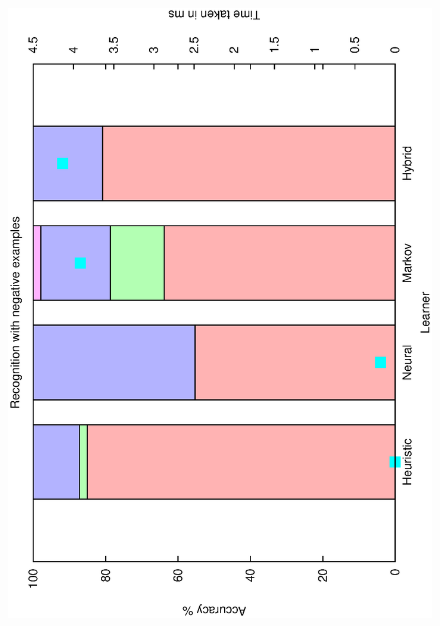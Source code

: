 \documentclass[12pt,a4,notitlepage]{report}
\renewcommand{\_}{\texttt{\symbol{95}}}
\newcommand{\<}{\texttt{\symbol{60}}}
\renewcommand{\>}{\texttt{\symbol{62}}}
\begin{document}
\begin{figure}
\centering
\includegraphics[scale=0.3,angle=-90]{results/all/recog.ps}

\end{figure}
\end{document}
